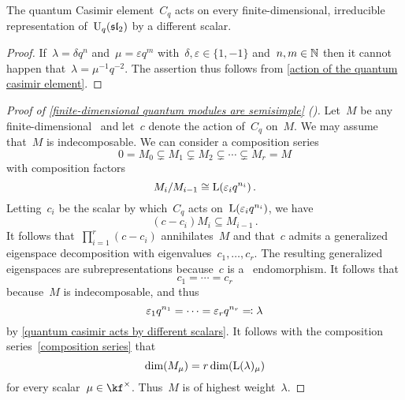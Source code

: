 \documentclass[a4paper, 11pt, oneside]{scrartcl}
\begin{document}
\begin{corollary}
  \label{quantum casimir acts by different scalars}
  The quantum Casimir element~$C_q$ acts on every finite-dimensional, irreducible representation of~$\operatorname{U}_q(\mathfrak{sl}_2)$ by a different scalar.
\end{corollary}

\begin{proof}
  If~$\lambda = \delta q^n$ and~$\mu = \varepsilon q^m$ with~$\delta, \varepsilon \in \{1, -1\}$ and~$n, m \in \mathbb{N}$ then it cannot happen that~$\lambda = \mu^{-1} q^{-2}$.
  The assertion thus follows from \cref{action of the quantum casimir element}.
\end{proof}

\begin{proof}[Proof of \cref{finite-dimensional quantum modules are semisimple} ({\cite[Theorem~2.9]{jantzen_quantum}})]
  Let~$M$ be any finite-dimensional~ and let~$c$ denote the action of~$C_q$ on~$M$.
  We may assume that~$M$ is indecomposable.
  We can consider a composition series
  \begin{equation}
    \label{composition series}
    0
    =
    M_0
    \subsetneq
    M_1
    \subsetneq
    M_2
    \subsetneq
    \dotsb
    \subsetneq
    M_r
    =
    M
  \end{equation}
  with composition factors
  \[
    M_i/M_{i-1}
    \cong
    \operatorname{L}(\varepsilon_i q^{n_i}) \,.
  \]
  Letting~$c_i$ be the scalar by which~$C_q$ acts on~$\operatorname{L}(\varepsilon_i q^{n_i})$, we have
  \[
    (c - c_i) M_i \subseteq M_{i-1} \,.
  \]
  It follows that~$\prod_{i=1}^r (c - c_i)$ annihilates~$M$ and that~$c$ admits a generalized eigenspace decomposition with eigenvalues~$c_1, \dotsc, c_r$.
  The resulting generalized eigenspaces are subrepresentations because~$c$ is a~ endomorphism.
  It follows that
  \[
    c_1 = \dotsb = c_r
  \]
  because~$M$ is indecomposable, and thus
  \[
    \varepsilon_1 q^{n_1}
    =
    \dotsb
    =
    \varepsilon_r q^{n_r}
    \eqqcolon
    \lambda
  \]
  by \cref{quantum casimir acts by different scalars}.
  It follows with the composition series~\eqref{composition series} that
  \[
    \dim( M_\mu )
    =
    r \dim( \operatorname{L}(\lambda)_\mu )
  \]
  for every scalar~$\mu \in \kf^\times$.
  Thus~$M$ is of highest weight~$\lambda$.


\end{proof}
\end{document}
